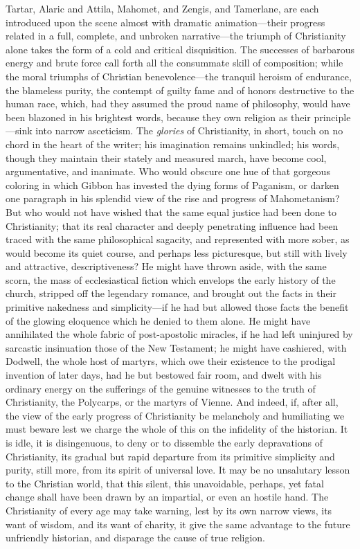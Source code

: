 Tartar, Alaric and Attila, Mahomet, and Zengis, and Tamerlane, are each
introduced upon the scene almost with dramatic animation—their progress
related in a full, complete, and unbroken narrative—the triumph of Christianity
alone takes the form of a cold and critical disquisition. The successes of
barbarous energy and brute force call forth all the consummate skill of
composition; while the moral triumphs of Christian benevolence—the tranquil
heroism of endurance, the blameless purity, the contempt of guilty fame and
of honors destructive to the human race, which, had they assumed the proud
name of philosophy, would have been blazoned in his brightest words, because
they own religion as their principle—sink into narrow asceticism. The
\textit{glories} of Christianity, in short, touch on no chord in the heart
of the writer; his imagination remains unkindled; his words, though they
maintain their stately and measured march, have become cool, argumentative,
and inanimate. Who would obscure one hue of that gorgeous coloring in which
Gibbon has invested the dying forms of Paganism, or darken one paragraph in
his splendid view of the rise and progress of Mahometanism? But who would not
have wished that the same equal justice had been done to Christianity; that
its real character and deeply penetrating influence had been traced with the
same philosophical sagacity, and represented with more sober, as would become
its quiet course, and perhaps less picturesque, but still with lively and
attractive, descriptiveness? He might have thrown aside, with the same scorn,
the mass of ecclesiastical fiction which envelops the early history of the
church, stripped off the legendary romance, and brought out the facts in
their primitive nakedness and simplicity—if he had but allowed those facts
the benefit of the glowing eloquence which he denied to them alone. He might
have annihilated the whole fabric of post-apostolic miracles, if he had left
uninjured by sarcastic insinuation those of the New Testament; he might have
cashiered, with Dodwell, the whole host of martyrs, which owe their existence
to the prodigal invention of later days, had he but bestowed fair room, and
dwelt with his ordinary energy on the sufferings of the genuine witnesses to
the truth of Christianity, the Polycarps, or the martyrs of Vienne. And
indeed, if, after all, the view of the early progress of Christianity be
melancholy and humiliating we must beware lest we charge the whole of this
on the infidelity of the historian. It is idle, it is disingenuous, to deny
or to dissemble the early depravations of Christianity, its gradual but rapid
departure from its primitive simplicity and purity, still more, from its
spirit of universal love. It may be no unsalutary lesson to the Christian
world, that this silent, this unavoidable, perhaps, yet fatal change shall
have been drawn by an impartial, or even an hostile hand. The Christianity
of every age may take warning, lest by its own narrow views, its want of
wisdom, and its want of charity, it give the same advantage to the future
unfriendly historian, and disparage the cause of true religion.

